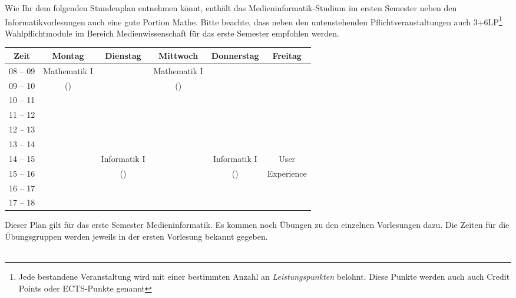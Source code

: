 
Wie Ihr dem folgenden Stundenplan entnehmen könnt, enthält das Medieninformatik-Studium im ersten
Semester neben den Informatikvorlesungen auch eine gute Portion Mathe. Bitte beachte, dass neben den untenstehenden Pflichtveranstaltungen auch 3+6LP\footnote{Jede bestandene Veranstaltung wird mit einer bestimmten Anzahl an \emph{Leistungspunkten} belohnt. Diese Punkte werden auch auch Credit Points oder ECTS-Punkte genannt} Wahlpflichtmodule im Bereich Medienwissenschaft für das erste Semester empfohlen werden. \\
\noindent{}

\begin{minipage}{\textwidth}
    \footnotesize
\begin{center}
	\begin{tabular}{|c|c|c|c|c|c|}
	\hline
	 Zeit     &    Montag      	& Dienstag    	& Mittwoch    	& Donnerstag 		& Freitag 	\\ \hline\hline
	 08 -- 09 &    Mathematik I	&             	& Mathematik I	& 					&  			\\ \cline{1-1} \cline{3-3} \cline{5-6}
	 09 -- 10 &    (\Matheprof)	&             	& (\Matheprof)	& 					&  			\\ \hline
	 10 -- 11 &                	&             	&             	& 					&  			\\ \hline
	 11 -- 12 &                	&             	&             	& 					&  			\\ \hline
	 12 -- 13 &                	&             	&             	& 					&  			\\ \hline
	 13 -- 14 &                	&             	&             	& 					&  			\\ \hline
	 14 -- 15 &                	& Informatik I	&             	& Informatik I 		&  User		\\ \cline{1-2} \cline{4-4}
	 15 -- 16 &                	& (\Infoprof) 	&             	& (\Infoprof) 		&  Experience\\ \hline
	 16 -- 17 &                	&             	&             	& 					&  			\\ \hline
	 17 -- 18 &                	&             	&             	& 					&  			\\ \hline
	\end{tabular}

\end{center}
\end{minipage}

Dieser Plan gilt für das erste Semester Medieninformatik. 
Es kommen noch Übungen zu den einzelnen Vorlesungen dazu. Die Zeiten für die Übungsgruppen werden jeweils in der ersten Vorlesung bekannt gegeben. \\ \\
